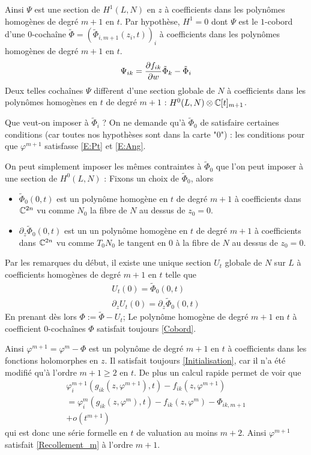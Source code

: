 \documentclass[a4paper,11pt,draft,makeidx,twocolumn]{amsart}
\begin{document}
Ainsi $\Psi$ est une section de $H^1(L,N)$ en $z$ à coefficients dans les polynômes homogènes de degré $m+1$ en $t$. Par hypothèse, $H^1 = 0$ dont $\Psi$ est le $1$-cobord  d'une $0$-cochaîne $\tilde{\Phi} = (\tilde{\Phi}_{i,m+1}(z_i,t))_i$ à coefficients dans les polynômes homogènes de degré $m+1$ en $t$.
\begin{equation}\label{Cobord}
\Psi_{ik} = \dfrac{\partial{f_{ik}}}{\partial{w}}\tilde{\Phi}_k - \tilde\Phi_i
\end{equation}
Deux telles cochaînes $\Psi$ diffèrent d'une section globale de $N$ à coefficients dans les polynômes homogènes en $t$ de degré $m+1$ : $H^0(L,N) \otimes \mathbb{C}[t]_{m+1}$.

Que veut-on imposer à $\tilde\Phi_i$ ?
On ne demande qu'à $\tilde\Phi_0$ de satisfaire certaines conditions (car toutes nos hypothèses sont dans la carte "$0$") : les conditions pour que $\varphi^{m+1}$ satisfasse \eqref{E:Pt} et \eqref{E:Ang}.

On peut simplement imposer les mêmes contraintes à $\tilde\Phi_0$ que l'on peut imposer à une section de $H^0(L,N)$ : Fixons un choix de $\tilde\Phi_0$, alors
\begin{itemize}
 \item $\tilde\Phi_0(0,t)$ est un polynôme homogène en $t$ de degré $m+1$ à coefficients dans $\mathbb{C}^{2n}$ vu comme $N_0$ la fibre de $N$ au dessus de $z_0=0$.
\item $\partial_z \tilde\Phi_0(0,t)$ est un un polynôme homogène en $t$ de degré $m+1$ à coefficients dans $\mathbb{C}^{2n}$ vu comme $T_0N_0$ le tangent en $0$ à la fibre de $N$ au dessus de $z_0=0$.
 \end{itemize}
Par les remarques du début, il existe une unique section $U_t$ globale de $N$ sur $L$ à coefficients homogènes de degré $m+1$ en $t$ telle que
\begin{subequations}\label{U}
\begin{gather}
	U_t(0) = \tilde\Phi_0(0,t)\\
	\partial_z U_t (0) = \partial_z \tilde\Phi_0(0,t)
\end{gather}
\end{subequations}
En prenant dès lors $\Phi := \tilde\Phi - U_t$; Le polynôme homogène de degré $m+1$ en $t$ à coefficient $0$-cochaînes $\Phi$ satisfait toujours \eqref{Cobord}.

Ainsi $\varphi^{m+1} = \varphi^m - \Phi$ est un polynôme de degré $m+1$ en $t$ à coefficients dans les fonctions holomorphes en $z$. Il satisfait toujours \eqref{Initialisation}, car il n'a été modifié qu'à l'ordre $m+1 \geq 2$ en $t$.
De plus un calcul rapide permet de voir que
\begin{multline}
\varphi^{m+1}_i(g_{ik}(z,\varphi^{m+1}),t) - f_{ik}(z, \varphi^{m+1}) \\= 
\varphi^{m}_i(g_{ik}(z,\varphi^{m}),t) - f_{ik}(z, \varphi^{m}) - \Phi_{ik,m+1}\\
+o(t^{m+1})
\end{multline}
qui est donc une série formelle en $t$ de valuation au moins $m+2$. Ainsi $\varphi^{m+1}$ satisfait \eqref{Recollement_m} à l'ordre $m+1$.
\end{document}
